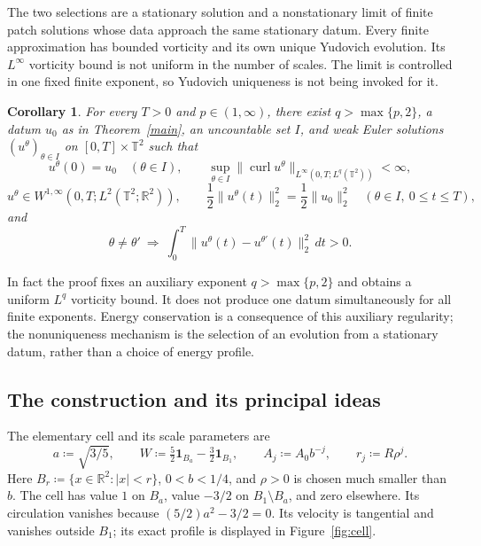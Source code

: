 \documentclass[11pt]{amsart}
\newtheorem{corollary}[theorem]{Corollary}
\theoremstyle{remark}
\numberwithin{equation}{section}
\newcommand{\R}{\mathbb R}
\newcommand{\T}{\mathbb T}
\begin{document}
The two selections are a stationary solution and a nonstationary limit
of finite patch solutions whose data approach the same stationary
datum. Every finite approximation has bounded vorticity and its own
unique Yudovich evolution. Its $L^\infty$ vorticity bound is not uniform
in the number of scales. The limit is controlled in one fixed finite
exponent, so Yudovich uniqueness is not being invoked for it.

\begin{corollary}
\label{intro:refinement}
For every $T>0$ and $p\in(1,\infty)$, there exist
$q>\max\{p,2\}$, a datum $u_0$ as in Theorem~\ref{main}, an
uncountable set $I$, and weak Euler solutions
$(u^\theta)_{\theta\in I}$ on $[0,T]\times\T^2$ such that
\[
 u^\theta(0)=u_0\quad(\theta\in I),\qquad
 \sup_{\theta\in I}
 \|\operatorname{curl}u^\theta\|_{L^\infty(0,T;L^q(\T^2))}<\infty,
\]
\[
 u^\theta\in W^{1,\infty}(0,T;L^2(\T^2;\R^2)),\qquad
 \frac12\|u^\theta(t)\|_2^2=\frac12\|u_0\|_2^2
 \quad(\theta\in I,\ 0\le t\le T),
\]
and
\[
 \theta\ne\theta'\ \Longrightarrow\
 \int_0^T\|u^\theta(t)-u^{\theta'}(t)\|_2^2\,dt>0.
\]
\end{corollary}

In fact the proof fixes an auxiliary exponent
$q>\max\{p,2\}$ and obtains a uniform $L^q$ vorticity bound.
It does not produce one datum simultaneously for all finite exponents.
Energy conservation is a consequence of this auxiliary regularity;
the nonuniqueness mechanism is the selection of an evolution from a
stationary datum, rather than a choice of energy profile.

\subsection{The construction and its principal ideas}
The elementary cell and its scale parameters are
\begin{equation}\label{intro:definitions}
 a\coloneqq\sqrt{3/5},\qquad
 W\coloneqq\tfrac52\mathbf1_{B_a}-\tfrac32\mathbf1_{B_1},\qquad
 A_j\coloneqq A_0b^{-j},\qquad r_j\coloneqq R\rho^j .
\end{equation}
Here $B_r\coloneqq\{x\in\R^2:|x|<r\}$,
$0<b<1/4$, and $\rho>0$ is chosen much smaller than $b$.
The cell has value $1$ on $B_a$, value $-3/2$ on $B_1\setminus B_a$,
and zero elsewhere. Its circulation vanishes because
$(5/2)a^2-3/2=0$. Its velocity is tangential and vanishes outside
$B_1$; its exact profile is displayed in Figure~\ref{fig:cell}.
\end{document}
